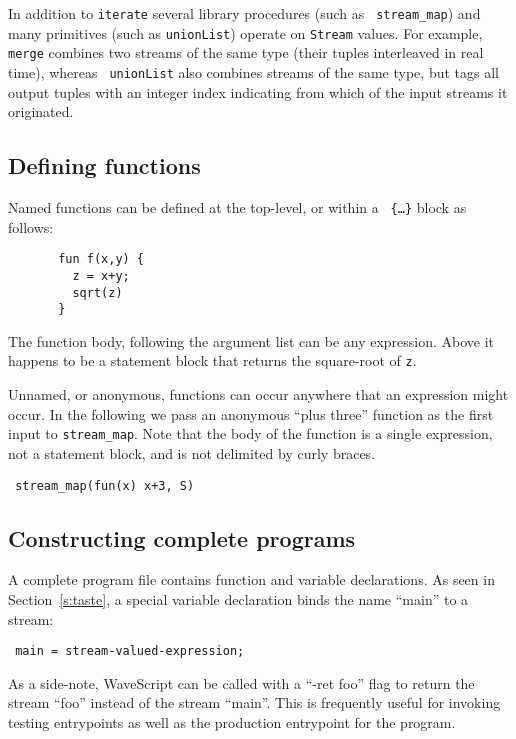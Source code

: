 \documentclass[twocolumn]{report}
\newcommand{\ws}{WaveScript}
\newenvironment{wscode}{\begin{center}\tt}{\end{center}}
\begin{document}
In addition to {\tt iterate} several library procedures (such as {\tt
stream\_map}) and many primitives (such as {\tt unionList}) operate on
{\tt Stream} values.  For example, {\tt merge} combines two streams of the same
type (their tuples interleaved in real time), whereas {\tt
  unionList} also combines streams of the same type, but tags all
output tuples with an integer index indicating from which of the input
streams it originated.


\subsection{Defining functions}
\label{udfs}

Named functions can be defined at the top-level, or within a {\tt
  \{\ldots\}} block as follows:
\begin{verbatim}
       fun f(x,y) {
         z = x+y;
         sqrt(z)
       }
\end{verbatim}

The function body, following the argument list can be any expression.
Above it happens to be a statement block that returns the
square-root of {\tt z}.

Unnamed, or anonymous, functions can occur anywhere that an expression
might occur. In the following we pass an anonymous ``plus three''
function as the first input to {\tt stream\_map}.  Note that the body
of the function is a single expression, not a statement block, and is
not delimited by curly braces.

\begin{wscode}
stream\_map(fun(x) x+3, S)
\end{wscode}

\subsection{Constructing complete programs}

A complete program file contains function and variable declarations.
As seen in Section~\ref{s:taste}, a special variable declaration
binds the name ``main'' to a stream:
\begin{wscode}
main = stream-valued-expression;
\end{wscode}
As a side-note, {\ws} can be called with a ``-ret foo'' flag to return
the stream ``foo'' instead of the stream ``main''.  This is frequently
useful for invoking testing entrypoints as well as the production
entrypoint for the program.  
\end{document}
